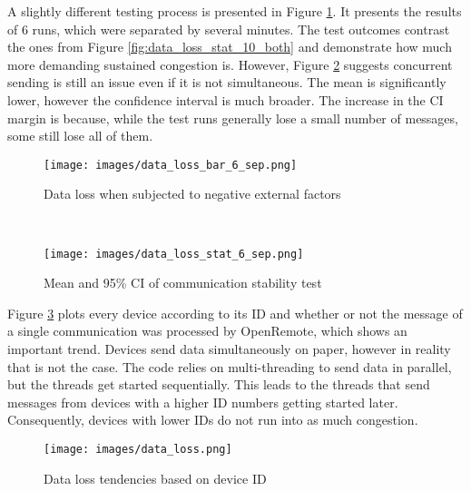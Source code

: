 A slightly different testing process is presented in Figure \ref{fig:data_loss_bar_6_sep}. It presents the results of 6 runs, which were separated by several minutes. The test outcomes contrast the ones from Figure \ref{fig:data_loss_stat_10_both} and demonstrate how much more demanding sustained congestion is. However, Figure \ref{fig:data_loss_stat_6_sep} suggests concurrent sending is still an issue even if it is not simultaneous. The mean is significantly lower, however the confidence interval is much broader. The increase in the CI margin is because, while the test runs generally lose a small number of messages, some still lose all of them.


\begin{figure*}[ht]
	\centering
	\begin{subfigure}[t]{0.5\textwidth}
    	\centering
		\texttt{[image: images/data\_loss\_bar\_6\_sep.png]}
		\caption{Data loss when subjected to negative external factors}
		\label{fig:data_loss_bar_6_sep}
	\end{subfigure}%
	~
	\begin{subfigure}[t]{0.5\textwidth}
		\centering
		\texttt{[image: images/data\_loss\_stat\_6\_sep.png]}
		\caption{Mean and 95\% CI of communication stability test}
		\label{fig:data_loss_stat_6_sep}
	\end{subfigure}
	\caption{Message loss test results after 6 separate runs}
\end{figure*}

\begin{figure}[h!]

\end{figure}

\begin{figure}[ht]

\end{figure}
Figure \ref{fig:data_loss} plots every device according to its ID and whether or not the message of a single communication was processed by OpenRemote, which shows an important trend. Devices send data simultaneously on paper, however in reality that is not the case. The code relies on multi-threading to send data in parallel, but the threads get started sequentially. This leads to the threads that send messages from devices with a higher ID numbers getting started later. Consequently, devices with lower IDs do not run into as much congestion.

\begin{figure}[h!]
    \centering
    \texttt{[image: images/data\_loss.png]}
    \caption{Data loss tendencies based on device ID}
    \label{fig:data_loss}
\end{figure}

